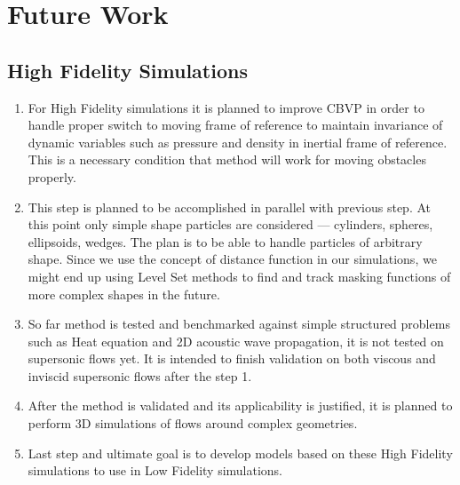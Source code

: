\chapter{Future Work}
\label{chapter:6}
\section{High Fidelity Simulations}
\begin{enumerate}[1.]
\item
{} For High Fidelity simulations it is planned to improve CBVP in order to handle proper switch to moving frame of reference to maintain invariance of dynamic variables such as pressure and density in inertial frame of reference. This is a necessary condition that method will work for moving 
obstacles properly.

\item
{} This step is planned to be accomplished in parallel with previous step. At this point only simple shape particles are considered --- cylinders, spheres, ellipsoids, wedges. The plan is to be able to handle particles of arbitrary shape. Since we use the concept of distance function in our simulations, we might end up using Level Set methods \cite{book:levset} to find and track masking functions of more complex shapes in the future.

\item
{} So far method is tested and benchmarked against simple structured problems such as Heat equation and 2D acoustic wave propagation, it is not tested on supersonic flows yet. It is intended to finish validation on both viscous and inviscid supersonic flows after the step 1.

\item
{} After the method is validated and its applicability is justified, it is planned to perform 3D simulations of flows around complex geometries.

\item
{} Last step and ultimate goal is to develop models based on these High Fidelity simulations to use in Low Fidelity simulations. 
\end{enumerate}

